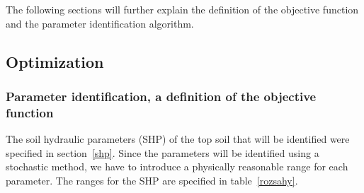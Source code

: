 \documentclass[review]{elsarticle}
\begin{document}


The following sections will further explain the definition of the objective function and the parameter identification algorithm.



\subsection{Optimization}

\subsubsection{Parameter identification, a definition of the objective function} %
\label{objdef}

The soil hydraulic parameters (SHP) of the top soil that will be identified were specified in section~\ref{shp}.
Since the parameters will be identified using a stochastic method, we have to introduce a physically reasonable range for each parameter. The ranges for the SHP are specified in table~\ref{rozsahy}.
\end{document}
